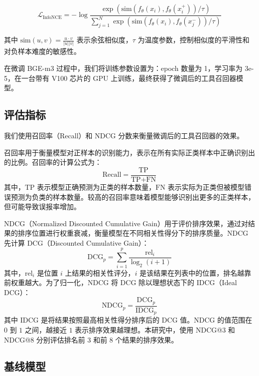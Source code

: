 \begin{equation}
\mathcal{L}_{\text{InfoNCE}} = -\log \frac{\exp(\text{sim}(f_{\theta}(x_i), f_{\theta}(x_i^+))/\tau)}{\sum_{j=1}^N \exp(\text{sim}(f_{\theta}(x_i), f_{\theta}(x_j^-))/\tau)}
\end{equation}

其中 $\text{sim}(u, v) = \frac{u \cdot v}{|u| |v|}$ 表示余弦相似度，$\tau$ 为温度参数，控制相似度的平滑性和对负样本难度的敏感性。

在微调 BGE-m3 过程中，我们将训练参数设置为：epoch 数量为 1，学习率为 3e-5，在一台带有 V100 芯片的 GPU 上训练，最终获得了微调后的工具召回器模型。

\subsection{评估指标}

我们使用召回率（Recall）\cite{buckland1994relationship, powers2020evaluation}和 NDCG 分数\cite{wang2013theoretical}来衡量微调后的工具召回器的效果。

召回率用于衡量模型对正样本的识别能力，表示在所有实际正类样本中正确识别出的比例。召回率的计算公式为：
\begin{equation}
\text{Recall} = \frac{\text{TP}}{\text{TP} + \text{FN}}
\end{equation}
其中，$\text{TP}$ 表示模型正确预测为正类的样本数量，$\text{FN}$ 表示实际为正类但被模型错误预测为负类的样本数量。较高的召回率意味着模型能够识别出更多的正类样本，但可能导致误报率增加。

NDCG（Normalized Discounted Cumulative Gain）用于评价排序效果，通过对结果的排序位置进行权重衰减，衡量模型在不同相关性得分下的排序质量。NDCG 先计算 DCG（Discounted Cumulative Gain）：
\begin{equation}
\text{DCG}_p = \sum_{i=1}^{p} \frac{\text{rel}_i}{\log_2(i+1)}
\end{equation}
其中，$\text{rel}_i$ 是位置 $i$ 上结果的相关性评分，$i$ 是该结果在列表中的位置，排名越靠前权重越大。为了归一化，NDCG 将 DCG 除以理想状态下的 IDCG（Ideal DCG）：
\begin{equation}
\text{NDCG}_p = \frac{\text{DCG}_p}{\text{IDCG}_p}
\end{equation}
其中 IDCG 是将结果按照最高相关性得分排序后的 DCG 值。NDCG 的值范围在 $0$ 到 $1$ 之间，越接近 $1$ 表示排序效果越理想。本研究中，使用 NDCG@3 和 NDCG@8 分别评估排名前 3 和前 8 个结果的排序效果。

\subsection{基线模型}

